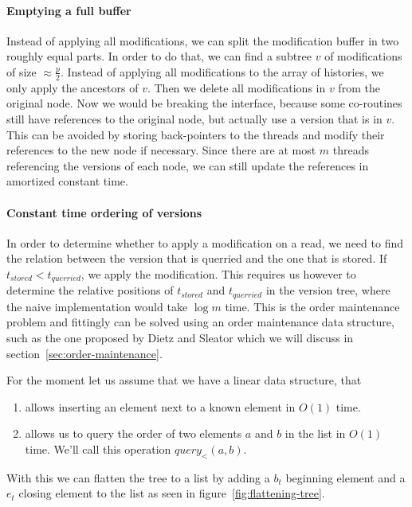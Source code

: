 \documentclass[11pt]{Thesis}
\theoremstyle{definition}
\newcommand{\Figref}[1]{figure~\ref{fig:#1}}
\newcommand{\Secref}[1]{section~\ref{sec:#1}}
\begin{document}
\paragraph{Emptying a full buffer} Instead of applying all modifications, we 
can split the modification buffer in two roughly equal parts. In order to do 
that, we can find a subtree $v$ of modifications of size $\approx \frac{p}{2}$. 
Instead of applying all modifications to the array of histories, we only 
apply the ancestors of $v$. Then we delete all modifications in $v$ from the 
original node. Now we would be breaking the interface, because some 
co-routines still have references to the original node, but actually use a 
version that is in $v$. This can be avoided by storing back-pointers to the 
threads and modify their references to the new node if necessary. Since there
are at most $m$ threads referencing the versions of each node, we can still
update the references in amortized constant time.

\paragraph{Constant time ordering of versions}
In order to determine whether to apply a modification on a read, we need to 
find the relation between the version that is querried and the one that is 
stored. If $t_{stored} < t_{querried}$, we apply the modification. This 
requires us however to determine the relative positions of $t_{stored}$ and 
$t_{querried}$ in the version tree, where the naive implementation would take 
$\log m$ time. This is the order maintenance problem and fittingly can be 
solved using an order maintenance data structure, such as the one proposed by 
Dietz and Sleator\cite{Diet87b} which we will discuss in \Secref{order-maintenance}.

For the moment let us assume that we have a linear data structure, that
\begin{enumerate}
  \item allows inserting an element next to a known element in $O(1)$ time.
  \item allows us to query the order of two elements $a$ and $b$ in the list 
    in $O(1)$ time. We'll call this operation $query_<(a, b)$.
\end{enumerate}

With this we can flatten the tree to a list by adding a $b_t$ beginning 
element and a $e_t$ closing element to the list as seen in
\Figref{flattening-tree}.
\end{document}
